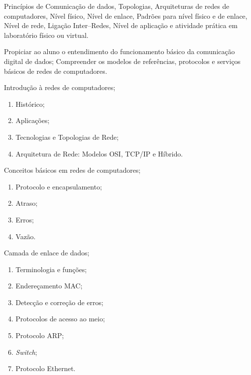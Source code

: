 \begin{pud}
	
	\ementa
	Princípios de Comunicação de dados, Topologias, Arquiteturas de redes de computadores, Nível físico, Nível de enlace, Padrões para nível físico e de enlace, Nível de rede, Ligação Inter--Redes, Nível de aplicação e atividade prática em laboratório físico ou virtual.
	
	\objetivos
	Propiciar ao aluno o entendimento do funcionamento básico da comunicação digital de dados; Compreender os modelos de referências, protocolos e serviços básicos de redes de computadores.
	

	\programa
	\begin{description}[itemsep=0em]
		\item[UNIDADE I:] Introdução à redes de computadores; 
	         \begin{enumerate}[itemsep=0em, topsep=0em]
	            \item Histórico;
	            \item Aplicações;
	            \item Tecnologias e Topologias de Rede;
	            \item Arquitetura de Rede: Modelos OSI, TCP/IP e Híbrido.
            \end{enumerate}
            
        \item[UNIDADE II:] Conceitos básicos em redes de computadores;
	         \begin{enumerate}[itemsep=0em, topsep=0em]
                \item Protocolo e encapsulamento;
                \item Atraso;
                \item Erros;
                \item Vazão.
            \end{enumerate}
            
         \item[UNIDADE III:]  Camada de enlace de dados;
	         \begin{enumerate}[itemsep=0em, topsep=0em]
                \item Terminologia e funções;
                \item  Endereçamento MAC;
                \item  Detecção e correção de erros;
                \item  Protocolos de acesso ao meio;
                \item  Protocolo ARP;
                \item  \textit{Switch};
                \item  Protocolo Ethernet.        
            \end{enumerate}
            

\end{description}
\end{pud}

